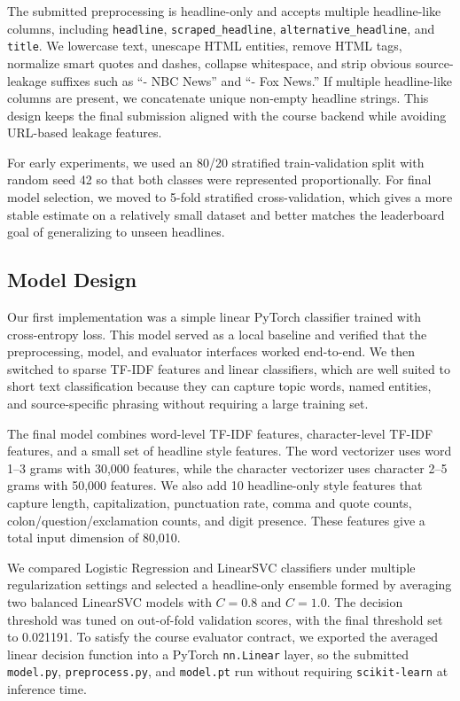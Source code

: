 \documentclass[10pt]{article}
\begin{document}
The submitted preprocessing is headline-only and accepts multiple headline-like columns, including \texttt{headline}, \texttt{scraped\_headline}, \texttt{alternative\_headline}, and \texttt{title}. We lowercase text, unescape HTML entities, remove HTML tags, normalize smart quotes and dashes, collapse whitespace, and strip obvious source-leakage suffixes such as ``- NBC News'' and ``- Fox News.'' If multiple headline-like columns are present, we concatenate unique non-empty headline strings. This design keeps the final submission aligned with the course backend while avoiding URL-based leakage features.

For early experiments, we used an 80/20 stratified train-validation split with random seed 42 so that both classes were represented proportionally. For final model selection, we moved to 5-fold stratified cross-validation, which gives a more stable estimate on a relatively small dataset and better matches the leaderboard goal of generalizing to unseen headlines.

\subsection{Model Design}
Our first implementation was a simple linear PyTorch classifier trained with cross-entropy loss. This model served as a local baseline and verified that the preprocessing, model, and evaluator interfaces worked end-to-end. We then switched to sparse TF-IDF features and linear classifiers, which are well suited to short text classification because they can capture topic words, named entities, and source-specific phrasing without requiring a large training set.

The final model combines word-level TF-IDF features, character-level TF-IDF features, and a small set of headline style features. The word vectorizer uses word 1--3 grams with 30,000 features, while the character vectorizer uses character 2--5 grams with 50,000 features. We also add 10 headline-only style features that capture length, capitalization, punctuation rate, comma and quote counts, colon/question/exclamation counts, and digit presence. These features give a total input dimension of 80,010.

We compared Logistic Regression and LinearSVC classifiers under multiple regularization settings and selected a headline-only ensemble formed by averaging two balanced LinearSVC models with $C=0.8$ and $C=1.0$. The decision threshold was tuned on out-of-fold validation scores, with the final threshold set to 0.021191. To satisfy the course evaluator contract, we exported the averaged linear decision function into a PyTorch \texttt{nn.Linear} layer, so the submitted \texttt{model.py}, \texttt{preprocess.py}, and \texttt{model.pt} run without requiring \texttt{scikit-learn} at inference time.
\end{document}
